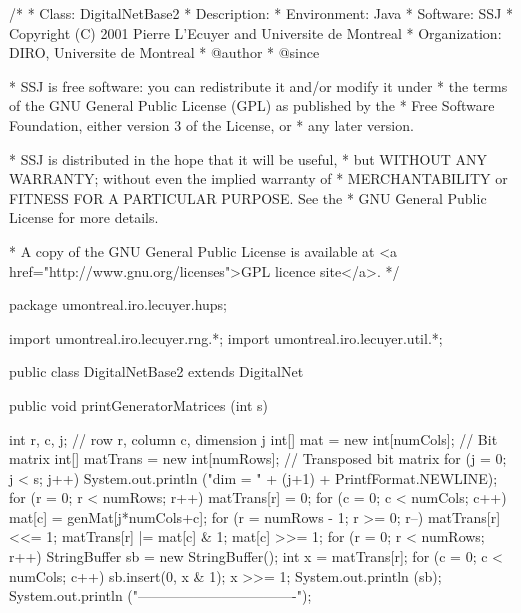 \begin{code}
\begin{hide}
/*
 * Class:        DigitalNetBase2
 * Description:  
 * Environment:  Java
 * Software:     SSJ 
 * Copyright (C) 2001  Pierre L'Ecuyer and Universite de Montreal
 * Organization: DIRO, Universite de Montreal
 * @author       
 * @since

 * SSJ is free software: you can redistribute it and/or modify it under
 * the terms of the GNU General Public License (GPL) as published by the
 * Free Software Foundation, either version 3 of the License, or
 * any later version.

 * SSJ is distributed in the hope that it will be useful,
 * but WITHOUT ANY WARRANTY; without even the implied warranty of
 * MERCHANTABILITY or FITNESS FOR A PARTICULAR PURPOSE.  See the
 * GNU General Public License for more details.

 * A copy of the GNU General Public License is available at
   <a href="http://www.gnu.org/licenses">GPL licence site</a>.
 */
\end{hide}
package umontreal.iro.lecuyer.hups;\begin{hide}

import umontreal.iro.lecuyer.rng.*;
import umontreal.iro.lecuyer.util.*;
\end{hide}

public class DigitalNetBase2 extends DigitalNet \begin{hide} {
   private int[] originalMat;    // Original matrices, without randomization.
   protected int[] genMat;       // The current generator matrix.
   protected int[] digitalShift;   // Stores the digital shift vector.
\end{hide}

   public void printGeneratorMatrices (int s) \begin{hide} {
      int r, c, j;                            // row r, column c, dimension j
      int[] mat = new int[numCols];           // Bit matrix
      int[] matTrans = new int[numRows];      // Transposed bit matrix
      for (j = 0; j < s; j++) {
         System.out.println ("dim = " + (j+1) + PrintfFormat.NEWLINE);
         for (r = 0; r < numRows; r++)
            matTrans[r] = 0;
         for (c = 0; c < numCols; c++) {
            mat[c] = genMat[j*numCols+c];
            for (r = numRows - 1; r >= 0; r--) {
               matTrans[r] <<= 1;
               matTrans[r] |= mat[c] & 1;
               mat[c] >>= 1;
            }
         }
         for (r = 0; r < numRows; r++) {
            StringBuffer sb = new StringBuffer();
            int x = matTrans[r];
            for (c = 0; c < numCols; c++) {
               sb.insert(0, x & 1);
               x >>= 1;
            }
            System.out.println (sb);
         }
         System.out.println ("----------------------------------");
      }
   }\end{hide}
\end{code}
